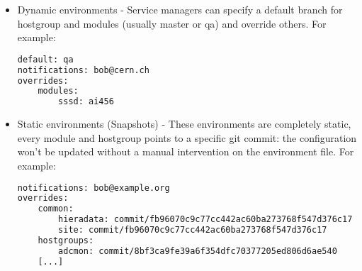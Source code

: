 \begin{itemize} 
    \item Dynamic environments - Service managers can specify a default branch for
hostgroup and modules (usually master or qa) and override others. For
example:

\begin{lstlisting}[language=bash, frame=single]
default: qa
notifications: bob@cern.ch
overrides:
    modules:
        sssd: ai456
\end{lstlisting}

    \item Static environments (Snapshots) - These environments are completely static,
every module and hostgroup points to a specific git commit: the
configuration won't be updated without a manual intervention on the
environment file. For example:

\begin{lstlisting}[language=bash, frame=single]
notifications: bob@example.org
overrides:
    common:
        hieradata: commit/fb96070c9c77cc442ac60ba273768f547d376c17
        site: commit/fb96070c9c77cc442ac60ba273768f547d376c17
    hostgroups:
        adcmon: commit/8bf3ca9fe39a6f354dfc70377205ed806d6ae540
    [...]
\end{lstlisting}
\end{itemize}


